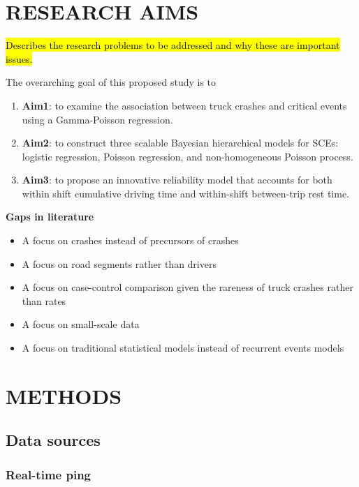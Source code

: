 \documentclass[12pt]{book}
\numberwithin{equation}{chapter}
\providecommand{\tightlist}{%
  \setlength{\itemsep}{0pt}\setlength{\parskip}{0pt}}
\begin{document}
\hypertarget{research-aims}{%
\chapter{RESEARCH AIMS}\label{research-aims}}

\hl{Describes the research problems to be addressed and why these are important issues.}

The overarching goal of this proposed study is to

\begin{enumerate}
\def\labelenumi{\arabic{enumi}.}
\item
  \textbf{Aim1}: to examine the association between truck crashes and critical events using a Gamma-Poisson regression.
\item
  \textbf{Aim2}: to construct three scalable Bayesian hierarchical models for SCEs: logistic regression, Poisson regression, and non-homogeneous Poisson process.
\item
  \textbf{Aim3}: to propose an innovative reliability model that accounts for both within shift cumulative driving time and within-shift between-trip rest time.
\end{enumerate}

\textbf{Gaps in literature}

\begin{itemize}
\tightlist
\item
  A focus on crashes instead of precursors of crashes
\item
  A focus on road segments rather than drivers
\item
  A focus on case-control comparison given the rareness of truck crashes rather than rates
\item
  A focus on small-scale data
\item
  A focus on traditional statistical models instead of recurrent events models
\end{itemize}

\hypertarget{methods}{%
\chapter{METHODS}\label{methods}}

\hypertarget{data-sources}{%
\section{Data sources}\label{data-sources}}

\hypertarget{real-time-ping}{%
\subsection{Real-time ping}\label{real-time-ping}}
\end{document}
